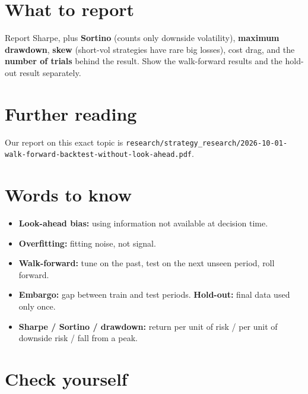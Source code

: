 \documentclass{article}
\begin{document}
\section{What to report}

Report Sharpe, plus \textbf{Sortino} (counts only downside volatility), \textbf{maximum drawdown}, \textbf{skew} (short-vol strategies have rare big losses), cost drag, and the \textbf{number of trials} behind the result. Show the walk-forward results and the hold-out result separately.

\section{Further reading}

Our report on this exact topic is \texttt{research/\allowbreak{}strategy\_\allowbreak{}research/\allowbreak{}2026-\allowbreak{}10-\allowbreak{}01-\allowbreak{}walk-\allowbreak{}forward-\allowbreak{}backtest-\allowbreak{}without-\allowbreak{}look-\allowbreak{}ahead.\allowbreak{}pdf}.

\section{Words to know}

\begin{itemize}

\item \textbf{Look-ahead bias:} using information not available at decision time.

\item \textbf{Overfitting:} fitting noise, not signal.

\item \textbf{Walk-forward:} tune on the past, test on the next unseen period, roll forward.

\item \textbf{Embargo:} gap between train and test periods. \textbf{Hold-out:} final data used only once.

\item \textbf{Sharpe /\allowbreak{} Sortino /\allowbreak{} drawdown:} return per unit of risk /\allowbreak{} per unit of downside risk /\allowbreak{} fall from a peak.

\end{itemize}

\section{Check yourself}
\end{document}
